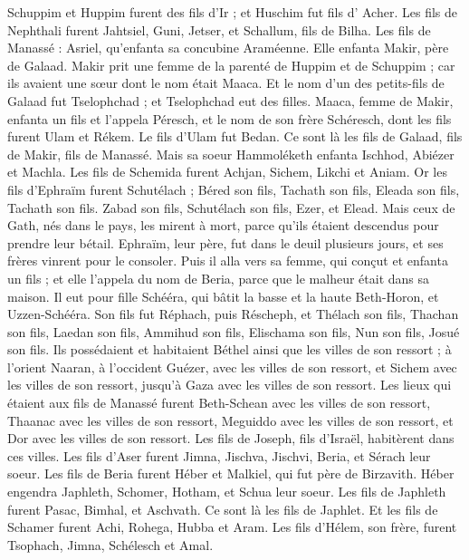 \begin{multicols}{2}
Schuppim et Huppim furent  des fils d’Ir ; et Huschim fut fils d' Acher.
Les fils de Nephthali furent Jahtsiel, Guni, Jetser, et Schallum, fils de Bilha.
Les fils de Manassé : Asriel, qu’enfanta sa concubine Araméenne. Elle enfanta Makir, père de Galaad.
Makir prit une femme de la parenté de Huppim et de Schuppim ; car ils avaient une sœur dont le nom était Maaca. Et le nom d'un des petits-fils de Galaad fut Tselophchad ; et Tselophchad eut des filles.
Maaca, femme de Makir, enfanta un fils et l'appela Péresch, et le nom de son frère Schéresch, dont les fils furent Ulam et Rékem.
Le fils d'Ulam fut Bedan. Ce sont là les fils de Galaad, fils de Makir, fils de Manassé.
Mais sa soeur Hammoléketh enfanta Ischhod, Abiézer et Machla.
Les fils de Schemida furent Achjan, Sichem, Likchi et Aniam.
Or les fils d'Ephraïm furent  Schutélach ; Béred son fils, Tachath son fils, Eleada son fils, Tachath son fils.
Zabad son fils, Schutélach son fils, Ezer, et Elead. Mais ceux de Gath, nés dans le pays, les mirent à mort, parce qu'ils étaient descendus pour prendre leur bétail.
Ephraïm, leur père, fut dans le deuil plusieurs jours, et ses frères vinrent pour le consoler.
Puis il alla vers sa femme, qui conçut et enfanta un fils ; et elle l'appela du nom de Beria, parce que le malheur était dans sa maison.
Il eut pour fille Schééra, qui bâtit la basse et la haute Beth-Horon, et Uzzen-Schééra.
Son fils fut  Réphach, puis Réscheph, et Thélach son fils, Thachan son fils,
Laedan son fils, Ammihud son fils, Elischama son fils,
Nun son fils, Josué son fils.
Ils possédaient et habitaient Béthel ainsi que les villes de son ressort ; à l’orient Naaran, à l’occident Guézer, avec les villes de son ressort, et Sichem avec les villes de son ressort, jusqu'à Gaza avec les villes de son ressort.
Les lieux qui étaient aux fils de Manassé furent  Beth-Schean avec les villes de son ressort, Thaanac avec les villes de son ressort, Meguiddo avec les villes de son ressort, et Dor avec les villes de son ressort. Les fils de Joseph, fils d'Israël, habitèrent dans ces villes.
Les fils d’Aser furent Jimna, Jischva, Jischvi, Beria, et Sérach leur soeur.
Les fils de Beria furent Héber et Malkiel, qui fut père de Birzavith.
Héber engendra Japhleth, Schomer, Hotham, et Schua leur soeur.
Les fils de Japhleth furent Pasac, Bimhal, et Aschvath. Ce sont là les fils de Japhlet.
Et les fils de Schamer furent Achi, Rohega, Hubba et Aram.
Les fils d'Hélem, son frère, furent  Tsophach, Jimna, Schélesch et Amal.

\end{multicols}
